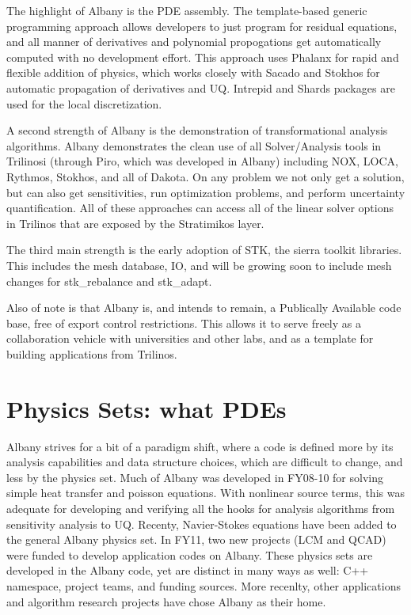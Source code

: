 \documentclass[pdf,12pt,report,strict]{SANDreport}
\theoremstyle{remark}
\begin{document}
The highlight of Albany is the PDE assembly. The template-based
generic programming approach allows developers to just program for
residual equations, and all manner of derivatives and polynomial
propogations get automatically computed with no development
effort. This approach uses Phalanx for rapid and flexible addition of
physics, which works closely with Sacado and Stokhos for automatic
propagation of derivatives and UQ. Intrepid and Shards packages are
used for the local discretization. 

A second strength of Albany is the
demonstration of transformational analysis algorithms. Albany
demonstrates the clean use of all Solver/Analysis tools in Trilinosi
(through Piro, which was developed in Albany) including NOX, LOCA,
Rythmos, Stokhos, and all of Dakota. On any problem we not only get a
solution, but can also get sensitivities, run optimization problems,
and perform uncertainty quantification. All of these approaches can
access all of the linear solver options in Trilinos that are exposed
by the Stratimikos layer. 

The third main strength is the early
adoption of STK, the sierra toolkit libraries. This includes the mesh
database, IO, and will be growing soon to include mesh changes for
stk\_rebalance and stk\_adapt.  

Also of note is that Albany is, and intends to remain, a 
Publically Available code base, free of export control 
restrictions. This allows it to serve freely as a collaboration
vehicle with universities and other labs, and as a template
for building applications from Trilinos.

\section{Physics Sets: what PDEs}

Albany strives for a bit of a paradigm shift, where a code is defined
more by its analysis capabilities and data structure choices, which
are difficult to change, and less by the physics set. Much of Albany
was developed in FY08-10 for solving simple heat transfer and poisson
equations. With nonlinear source terms, this was adequate for
developing and verifying all the hooks for analysis algorithms from
sensitivity analysis to UQ. Recenty, Navier-Stokes equations have been
added to the general Albany physics set. In FY11, two new projects
(LCM and QCAD) were funded to develop application codes on Albany. These physics sets
are developed in the Albany code, yet are distinct in many ways as
well: C++ namespace, project teams, and funding sources.  
More recenlty, other applications and algorithm research projects
have chose Albany as their home. 
\end{document}
